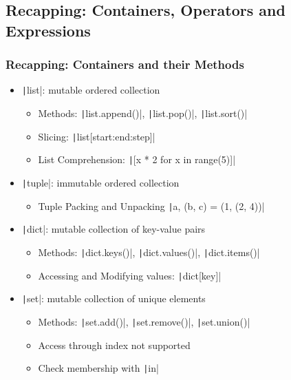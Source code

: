 \documentclass{beamer}
\newcommand{\python}[1]{\texttt|#1|}
\begin{document}
\subsection{Recapping: Containers, Operators and Expressions}
\begin{frame}
    \frametitle{Recapping: Containers and their Methods}
    \begin{itemize}
        \item \python{list}: mutable ordered collection
              \begin{itemize}
                  \item Methods: \python{list.append()}, \python{list.pop()}, \python{list.sort()}
                  \item Slicing: \python{list[start:end:step]}
                  \item List Comprehension: \python{[x * 2 for x in range(5)]}
              \end{itemize}
        \item \python{tuple}: immutable ordered collection
              \begin{itemize}
                  \item Tuple Packing and Unpacking \python{a, (b, c) = (1, (2, 4))}
              \end{itemize}
        \item \python{dict}: mutable collection of key-value pairs
              \begin{itemize}
                  \item Methods: \python{dict.keys()}, \python{dict.values()}, \python{dict.items()}
                  \item Accessing and Modifying values: \python{dict[key]}
              \end{itemize}
        \item \python{set}: mutable collection of unique elements
              \begin{itemize}
                  \item Methods: \python{set.add()}, \python{set.remove()}, \python{set.union()}
                  \item Access through index not supported
                  \item Check membership with \python{in}
              \end{itemize}
    \end{itemize}
\end{frame}
\end{document}
